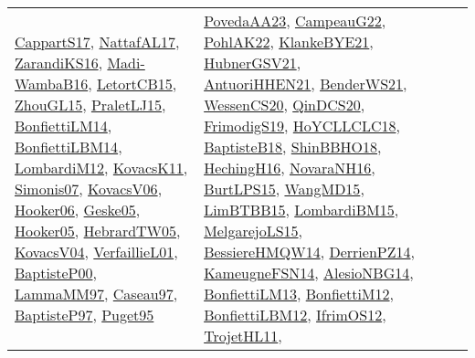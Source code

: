 {\begin{longtable}{lp{3cm}>{\raggedright}p{6cm}>{\raggedright}p{6cm}p{8cm}}
\href{papers/CappartS17.pdf}{CappartS17}\cite{CappartS17}, \href{articles/NattafAL17.pdf}{NattafAL17}\cite{NattafAL17}, \href{articles/ZarandiKS16.pdf}{ZarandiKS16}\cite{ZarandiKS16}, \href{papers/Madi-WambaB16.pdf}{Madi-WambaB16}\cite{Madi-WambaB16}, \href{articles/LetortCB15.pdf}{LetortCB15}\cite{LetortCB15}, \href{papers/ZhouGL15.pdf}{ZhouGL15}\cite{ZhouGL15}, \href{papers/PraletLJ15.pdf}{PraletLJ15}\cite{PraletLJ15}, \href{papers/BonfiettiLM14.pdf}{BonfiettiLM14}\cite{BonfiettiLM14}, \href{articles/BonfiettiLBM14.pdf}{BonfiettiLBM14}\cite{BonfiettiLBM14}, \href{articles/LombardiM12.pdf}{LombardiM12}\cite{LombardiM12}, \href{articles/KovacsK11.pdf}{KovacsK11}\cite{KovacsK11}, \href{articles/Simonis07.pdf}{Simonis07}\cite{Simonis07}, \href{papers/KovacsV06.pdf}{KovacsV06}\cite{KovacsV06}, \href{articles/Hooker06.pdf}{Hooker06}\cite{Hooker06}, \href{papers/Geske05.pdf}{Geske05}\cite{Geske05}, \href{articles/Hooker05.pdf}{Hooker05}\cite{Hooker05}, \href{papers/HebrardTW05.pdf}{HebrardTW05}\cite{HebrardTW05}, \href{papers/KovacsV04.pdf}{KovacsV04}\cite{KovacsV04}, \href{papers/VerfaillieL01.pdf}{VerfaillieL01}\cite{VerfaillieL01}, \href{articles/BaptisteP00.pdf}{BaptisteP00}\cite{BaptisteP00}, \href{articles/LammaMM97.pdf}{LammaMM97}\cite{LammaMM97}, \href{papers/Caseau97.pdf}{Caseau97}\cite{Caseau97}, \href{papers/BaptisteP97.pdf}{BaptisteP97}\cite{BaptisteP97}, \href{papers/Puget95.pdf}{Puget95}\cite{Puget95} & \href{papers/PovedaAA23.pdf}{PovedaAA23}\cite{PovedaAA23}, \href{articles/CampeauG22.pdf}{CampeauG22}\cite{CampeauG22}, \href{articles/PohlAK22.pdf}{PohlAK22}\cite{PohlAK22}, \href{papers/KlankeBYE21.pdf}{KlankeBYE21}\cite{KlankeBYE21}, \href{articles/HubnerGSV21.pdf}{HubnerGSV21}\cite{HubnerGSV21}, \href{papers/AntuoriHHEN21.pdf}{AntuoriHHEN21}\cite{AntuoriHHEN21}, \href{papers/BenderWS21.pdf}{BenderWS21}\cite{BenderWS21}, \href{papers/WessenCS20.pdf}{WessenCS20}\cite{WessenCS20}, \href{articles/QinDCS20.pdf}{QinDCS20}\cite{QinDCS20}, \href{papers/FrimodigS19.pdf}{FrimodigS19}\cite{FrimodigS19}, \href{papers/HoYCLLCLC18.pdf}{HoYCLLCLC18}\cite{HoYCLLCLC18}, \href{articles/BaptisteB18.pdf}{BaptisteB18}\cite{BaptisteB18}, \href{articles/ShinBBHO18.pdf}{ShinBBHO18}\cite{ShinBBHO18}, \href{papers/HechingH16.pdf}{HechingH16}\cite{HechingH16}, \href{articles/NovaraNH16.pdf}{NovaraNH16}\cite{NovaraNH16}, \href{papers/BurtLPS15.pdf}{BurtLPS15}\cite{BurtLPS15}, \href{articles/WangMD15.pdf}{WangMD15}\cite{WangMD15}, \href{papers/LimBTBB15.pdf}{LimBTBB15}\cite{LimBTBB15}, \href{papers/LombardiBM15.pdf}{LombardiBM15}\cite{LombardiBM15}, \href{papers/MelgarejoLS15.pdf}{MelgarejoLS15}\cite{MelgarejoLS15}, \href{papers/BessiereHMQW14.pdf}{BessiereHMQW14}\cite{BessiereHMQW14}, \href{papers/DerrienPZ14.pdf}{DerrienPZ14}\cite{DerrienPZ14}, \href{articles/KameugneFSN14.pdf}{KameugneFSN14}\cite{KameugneFSN14}, \href{papers/AlesioNBG14.pdf}{AlesioNBG14}\cite{AlesioNBG14}, \href{papers/BonfiettiLM13.pdf}{BonfiettiLM13}\cite{BonfiettiLM13}, \href{papers/BonfiettiM12.pdf}{BonfiettiM12}\cite{BonfiettiM12}, \href{papers/BonfiettiLBM12.pdf}{BonfiettiLBM12}\cite{BonfiettiLBM12}, \href{papers/IfrimOS12.pdf}{IfrimOS12}\cite{IfrimOS12}, \href{articles/TrojetHL11.pdf}{TrojetHL11}\cite{TrojetHL11}, 
\end{longtable}}
